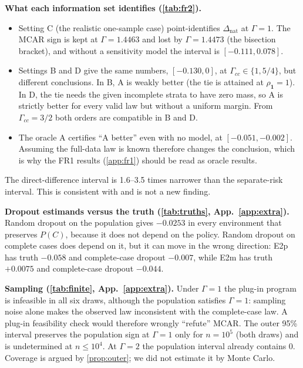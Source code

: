 \documentclass{article}
\theoremstyle{plain}
\theoremstyle{definition}
\theoremstyle{remark}
\newcommand{\one}{\mathbf{1}}
\newcommand{\Dnat}{\Delta_{\mathrm{nat}}}
\begin{document}
\textbf{What each information set identifies (\cref{tab:fr2}).}
\begin{itemize}
\item Setting C (the realistic one-sample case) point-identifies $\Dnat$ at
$\Gamma=1$. The MCAR sign is kept at $\Gamma=1.4463$ and lost by
$\Gamma=1.4473$ (the bisection bracket), and without a sensitivity model the
interval is $[-0.111,0.078]$.
\item Settings B and D give the same numbers, $[-0.130,0]$, at
$\Gamma_{cc}\in\{1,5/4\}$, but different conclusions. In B, A is weakly better
(the tie is attained at $\rho_{\one}=1$). In D, the tie needs the given
incomplete strata to have zero mass, so A is strictly better for every valid
law but without a uniform margin. From $\Gamma_{cc}=3/2$ both orders are
compatible in B and D.
\item The oracle A certifies ``A better'' even with no model, at
$[-0.051,-0.002]$. Assuming the full-data law is known therefore changes the
conclusion, which is why the FR1 results (\cref{app:fr1}) should be read as
oracle results.
\end{itemize}
The direct-difference interval is 1.6--3.5 times narrower than the
separate-risk interval. This is consistent with \citet{guerdan2024predictive}
and is not a new finding.





\textbf{Dropout estimands versus the truth (\cref{tab:truths}, App.~\ref{app:extra}).} Random dropout
on the population gives $-0.0253$ in every environment that preserves $P(C)$,
because it does not depend on the policy. Random dropout on complete cases
does depend on it, but it can move in the wrong direction: E2p has truth
$-0.058$ and complete-case dropout $-0.007$, while E2m has truth $+0.0075$ and
complete-case dropout $-0.044$.



\textbf{Sampling (\cref{tab:finite}, App.~\ref{app:extra}).} Under $\Gamma=1$ the plug-in program is
infeasible in all six draws, although the population satisfies $\Gamma=1$:
sampling noise alone makes the observed law inconsistent with the
complete-case law. A plug-in feasibility check would therefore wrongly
``refute'' MCAR. The outer 95\% interval preserves the population sign at
$\Gamma=1$ only for $n=10^5$ (both draws) and is undetermined at
$n\le10^4$. At $\Gamma=2$ the population interval already contains 0.
Coverage is argued by \cref{prop:outer}; we did not estimate it by Monte
Carlo.
\end{document}
